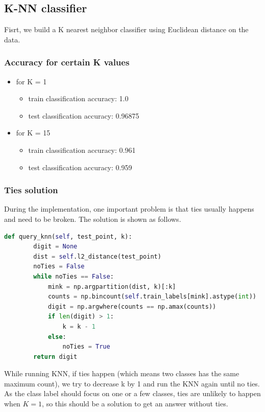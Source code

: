 \documentclass[a4paper]{article}
\begin{document}
\subsection{K-NN classifier}

Fisrt, we build a K nearest neighbor classifier using Euclidean distance on the data.

\subsubsection{Accuracy for certain K values}

\begin{itemize}
    \item for K = 1
    \begin{itemize}
        \item train classification accuracy: 1.0
        \item test classification accuracy: 0.96875
    \end{itemize}
    \item for K = 15
    \begin{itemize}
        \item train classification accuracy: 0.961
        \item test classification accuracy: 0.959
    \end{itemize}
\end{itemize}

\subsubsection{Ties solution}

During the implementation, one important problem is that ties usually happens and need to be broken. The solution is shown as follows.

\begin{lstlisting}[language = Python]
    def query_knn(self, test_point, k):
        digit = None
        dist = self.l2_distance(test_point)
        noTies = False
        while noTies == False:
            mink = np.argpartition(dist, k)[:k]
            counts = np.bincount(self.train_labels[mink].astype(int))
            digit = np.argwhere(counts == np.amax(counts))
            if len(digit) > 1:
                k = k - 1
            else:
                noTies = True
        return digit
\end{lstlisting}

While running KNN, if ties happen (which means two classes has the same maximum count), we try to decrease k by 1 and run the KNN again until no ties. As the class label should focus on one or a few classes, ties are unlikely to happen when $K=1$, so this should be a solution to get an answer without ties.
\end{document}
